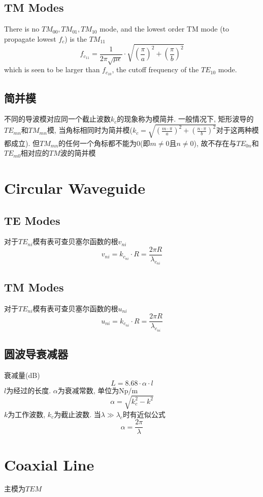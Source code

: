 \documentclass[a4paper]{report}
\begin{document}
\subsection{TM Modes}
There is no $TM_{00},TM_{01},TM_{10}$ mode, and the lowest order TM mode (to propagate lowest $f_c$) is the $TM_{11}$
$$
f_{c_{11}}=\frac{1}{2\pi\sqrt{\mu\epsilon}}\cdot\sqrt{(\frac{\pi}{a})^2+(\frac{\pi}{b})^2}
$$
which is seen to be larger than $f_{c_{10}}$, the cutoff frequency of the $TE_{10}$ mode. 
\subsection{简并模}
不同的导波模对应同一个截止波数$k_c$的现象称为模简并. 一般情况下, 矩形波导的$TE_{mn}$和$TM_{mn}$模, 当角标相同时为简并模($k_c=\sqrt{(\frac{m\cdot\pi}{a})^2+(\frac{n\cdot \pi}{b})^2}$对于这两种模都成立). 但$TM_{mn}$的任何一个角标都不能为0(即$m\neq 0$且$n\neq 0$), 故不存在与$TE_{0n}$和$TE_{m0}$相对应的$TM$波的简并模

\section{Circular Waveguide}

\subsection{TE Modes}
对于$TE_{ni}$模有表可查贝塞尔函数的根$v_{ni}$
$$v_{ni}=k_{c_{ni}}\cdot R=\frac{2\pi R}{\lambda_{c_{ni}}}$$
\subsection{TM Modes}
对于$TE_{ni}$模有表可查贝塞尔函数的根$u_{ni}$
$$u_{ni}=k_{c_{ni}}\cdot R=\frac{2\pi R}{\lambda_{c_{ni}}}$$
\subsection{圆波导衰减器}
衰减量(dB)
$$L=8.68\cdot \alpha \cdot l$$
$l$为经过的长度. $\alpha$为衰减常数, 单位为Np/m
$$\alpha=\sqrt{k_c^2-k^2}$$
$k$为工作波数, $k_c$为截止波数. 
当$\lambda\gg\lambda_c$时有近似公式
$$\alpha=\frac{2\pi}{\lambda}$$
\section{Coaxial Line}
主模为$TEM$
\end{document}

